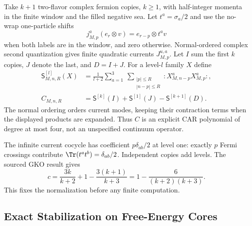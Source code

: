 Take $k+1$ two-flavor complex fermion copies, $k\ge1$, with half-integer
momenta in the finite window and the filled negative sea. Let
$t^a=\sigma_a/2$ and use the no-wrap one-particle shifts
\[
 j_{M,p}^a(e_r\otimes v)=e_{r-p}\otimes t^a v
\]
when both labels are in the window, and zero otherwise. Normal-ordered
complex second quantization gives finite quadratic currents $J_{M,p}^{u,a}$.
Let $I$ sum the first $k$ copies, $J$ denote the last, and $D=I+J$.
For a level-$l$ family $X$ define
\[
 \begin{aligned}
 \mathsf S^{[l]}_{M,n,R}(X)&=\frac1{l+2}
  \sum_{a=1}^3\ \sum_{\substack{|p|\le R\\|n-p|\le R}}
   {:}X_{M,n-p}^a X_{M,p}^a{:},\\
 C_{M,n,R}&=\mathsf S^{[k]}(I)+\mathsf S^{[1]}(J)-\mathsf S^{[k+1]}(D).
 \end{aligned}
\]
The normal ordering orders current modes, keeping their contraction terms
when the displayed products are expanded. Thus $C$ is an explicit CAR
polynomial of degree at most four, not an unspecified continuum operator.

The infinite current cocycle has coefficient $p\delta_{ab}/2$ at level
one: exactly $p$ Fermi crossings contribute $\Tr(t^at^b)=\delta_{ab}/2$.
Independent copies add levels. The sourced GKO result gives
\[
 c=\frac{3k}{k+2}+1-\frac{3(k+1)}{k+3}
   =1-\frac6{(k+2)(k+3)}.
\]
This fixes the normalization before any finite computation.

\subsection{Exact Stabilization on Free-Energy Cores}

